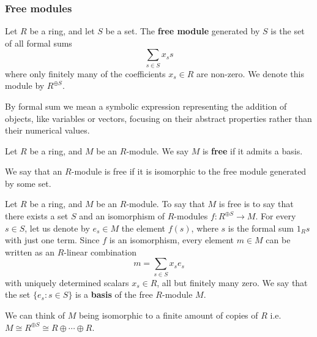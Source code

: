 \documentclass[12pt, a4paper]{article}
\begin{document}
\subsubsection{Free modules}


\begin{definition}
    Let \( R \) be a ring, and let \( S \) be a set. The \textbf{free module} generated by \( S \) is the set of all formal sums
    \[\sum_{s \in S} x_s s\]
    where only finitely many of the coefficients \( x_s \in R \) are non-zero. We denote this module by \( R^{\oplus S}\). 
\end{definition}

\begin{mdnote}
    By formal sum we mean a symbolic expression representing the addition of objects, like variables or vectors, focusing on their abstract properties rather than their numerical values.
\end{mdnote}

\begin{definition}
    Let \( R \) be a ring, and \( M \) be an \( R \)-module. We say \(M\) is \textbf{free} if it admits a basis.
\end{definition}

\begin{definition}
    We say that an \( R \)-module is free if it is isomorphic to the free module generated by some set.
\end{definition}

\begin{definition}
    Let \( R \) be a ring, and \( M \) be an \( R \)-module. To say that \( M \) is free is to say that there exists a set \( S \) and an isomorphism of \( R \)-modules \( f : R^{\oplus S} \to M \). For every \( s \in S \), let us denote by \( e_s \in M \) the element \( f(s) \), where \( s \) is the formal sum \( 1_R s \) with just one term. Since \( f \) is an isomorphism, every element \( m \in M \) can be written as an \( R \)-linear combination
    \[m = \sum_{s \in S} x_s e_s\]
    with uniquely determined scalars \( x_s \in R \), all but finitely many zero. We say that the set \( \{ e_s : s \in S \} \) is a \textbf{basis} of the free \( R \)-module \( M \). 
\end{definition}

\begin{mdnote}
    We can think of \(M\) being isomorphic to a finite amount of copies of \(R\) i.e.\ \(M \cong R^{\oplus S} \cong R \oplus \cdots \oplus R\).
\end{mdnote}
\end{document}
